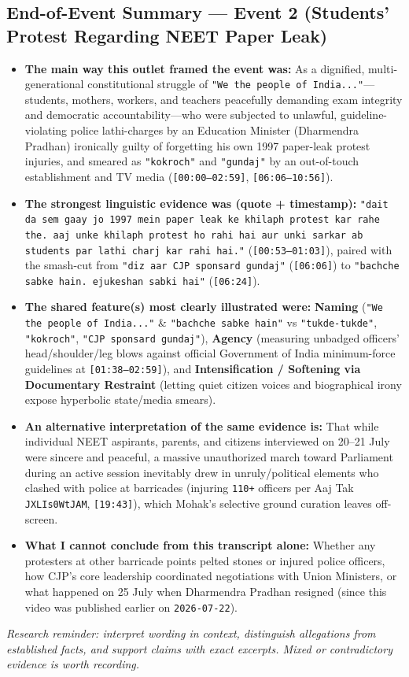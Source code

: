 \documentclass[10pt,a4paper]{article}
\begin{document}
\subsection*{End-of-Event Summary --- Event 2 (Students' Protest Regarding NEET Paper Leak)}
\begin{itemize}[leftmargin=1.5em, itemsep=3pt, topsep=4pt]
  \item \textbf{The main way this outlet framed the event was:} As a dignified, multi-generational constitutional struggle of \texttt{"We the people of India..."}---students, mothers, workers, and teachers peacefully demanding exam integrity and democratic accountability---who were subjected to unlawful, guideline-violating police lathi-charges by an Education Minister (Dharmendra Pradhan) ironically guilty of forgetting his own 1997 paper-leak protest injuries, and smeared as \texttt{"kokroch"} and \texttt{"gundaj"} by an out-of-touch establishment and TV media (\texttt{[00:00--02:59]}, \texttt{[06:06--10:56]}).
  \item \textbf{The strongest linguistic evidence was (quote + timestamp):} \texttt{"dait da sem gaay jo 1997 mein paper leak ke khilaph protest kar rahe the. aaj unke khilaph protest ho rahi hai aur unki sarkar ab students par lathi charj kar rahi hai."} (\texttt{[00:53--01:03]}), paired with the smash-cut from \texttt{"diz aar CJP sponsard gundaj"} (\texttt{[06:06]}) to \texttt{"bachche sabke hain. ejukeshan sabki hai"} (\texttt{[06:24]}).
  \item \textbf{The shared feature(s) most clearly illustrated were:} \textbf{Naming} (\texttt{"We the people of India..."} \& \texttt{"bachche sabke hain"} vs \texttt{"tukde-tukde"}, \texttt{"kokroch"}, \texttt{"CJP sponsard gundaj"}), \textbf{Agency} (measuring unbadged officers' head/shoulder/leg blows against official Government of India minimum-force guidelines at \texttt{[01:38--02:59]}), and \textbf{Intensification / Softening via Documentary Restraint} (letting quiet citizen voices and biographical irony expose hyperbolic state/media smears).
  \item \textbf{An alternative interpretation of the same evidence is:} That while individual NEET aspirants, parents, and citizens interviewed on 20--21 July were sincere and peaceful, a massive unauthorized march toward Parliament during an active session inevitably drew in unruly/political elements who clashed with police at barricades (injuring \texttt{110+} officers per Aaj Tak \texttt{JXLIs0WtJAM}, \texttt{[19:43]}), which Mohak's selective ground curation leaves off-screen.
  \item \textbf{What I cannot conclude from this transcript alone:} Whether any protesters at other barricade points pelted stones or injured police officers, how CJP's core leadership coordinated negotiations with Union Ministers, or what happened on 25 July when Dharmendra Pradhan resigned (since this video was published earlier on \texttt{2026-07-22}).
\end{itemize}
\textit{Research reminder: interpret wording in context, distinguish allegations from established facts, and support claims with exact excerpts. Mixed or contradictory evidence is worth recording.}
\end{document}
